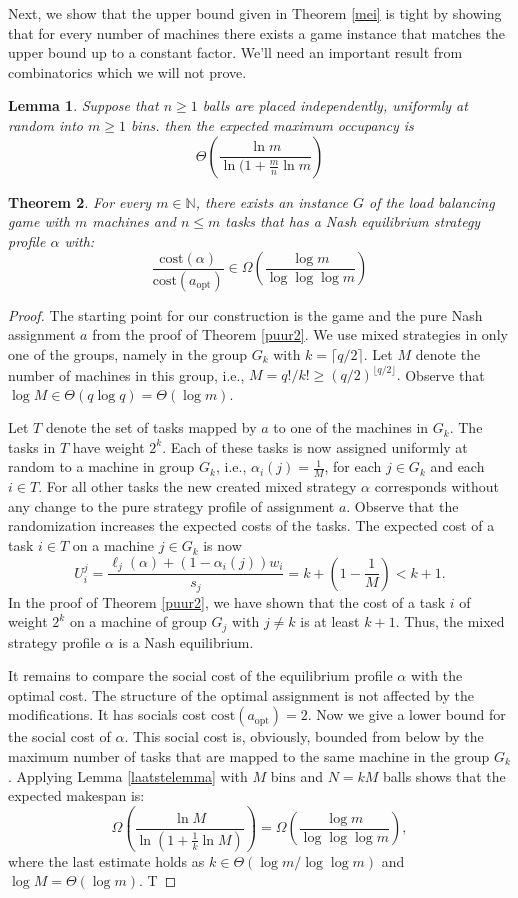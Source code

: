 \documentclass[a4paper,11pt]{article}
\newtheorem{theorem}{Theorem}[section]
\newtheorem{lemma}[theorem]{Lemma}
\newcommand{\N}{{\mathbb N}}
\newcommand{\cost}{\text{cost}}
\newcommand{\opt}{\text{opt}}
\newcommand{\copt}{\cost(a_{\opt})}
\begin{document}
Next, we show that the upper bound given in Theorem \ref{mei} is tight by showing that for every number of machines there exists a game instance that matches the upper bound up to a constant factor. We'll need an important result from combinatorics which we will not prove.

\begin{lemma}Suppose that $n \geq 1$ balls are placed independently, uniformly at random into $m \geq 1$ bins. then the expected maximum occupancy is
$$\Theta\left(\frac{\ln m}{\ln(1 + \frac{m}{n}\ln m} \right)$$
\end{lemma}\label{laatstelemma}


\begin{theorem}\label{mixed2}
For every $m \in \N$, there exists an instance $G$ of the load balancing game with $m$ machines and $n \leq m$ tasks that has a Nash equilibrium strategy profile $\alpha$ with:
$$\frac{\cost(\alpha)}{\copt} \in \Omega\left(\frac{\log m}{\log \log \log m} \right)$$
\end{theorem}

\begin{proof}
The starting point for our construction is the game and the pure Nash assignment $a$ from the proof of Theorem \ref{puur2}. We use mixed strategies in only one of the groups, namely in the group $G_k$ with $k = \lceil q/2 \rceil$. Let $M$ denote the number of machines in this group, i.e., $M = q!/k! \geq (q/2)^{\lfloor q/2 \rfloor}.$ Observe that $\log M \in \Theta(q \log q) = \Theta(\log m).$

Let $T$ denote the set of tasks mapped by $a$ to one of the machines in $G_k$. The tasks in $T$ have weight $2^k$. Each of these tasks is now assigned uniformly at random to a machine in group $G_k$, i.e., $\alpha_i(j)=\frac{1}{M}$, for each $j\in G_k$ and each $i \in T$. For all other tasks the new created mixed strategy $\alpha$ corresponds without any change to the pure strategy profile of assignment $a$. Observe that the randomization increases the expected costs of the tasks. The expected cost of a task $i\in T$ on a machine $j \in G_k$ is now
$$U_i^j = \frac{\ell_j(\alpha) + (1 - \alpha_i(j))w_i }{s_j} = k + \left(1 - \frac{1}{M}\right) < k+1.$$
In the proof of Theorem \ref{puur2}, we have shown that the cost of a task $i$ of weight $2^k$ on a machine of group $G_j$ with $j\neq k$ is at least $k+1$. Thus, the mixed strategy profile $\alpha$ is a Nash equilibrium.

It remains to compare the social cost of the equilibrium profile $\alpha$ with the optimal cost. The structure of the optimal assignment is not affected by the modifications. It has socials cost $\copt = 2$. Now we give a lower bound for the social cost of $\alpha$. This social cost is, obviously, bounded from below by the maximum number of tasks that are mapped to the same machine in the group $G_k$. Applying Lemma \ref{laatstelemma} with $M$ bins and $N = kM$ balls shows that the expected makespan is:
$$\Omega\left(\frac{\ln M}{\ln(1 + \frac{1}{k}\ln M)}\right) = \Omega\left(\frac{\log m}{\log\log\log m}\right),$$
where the last estimate holds as $k \in \Theta(\log m/\log \log m)$ and $\log M = \Theta(\log m)$. T
\end{proof}
\end{document}

